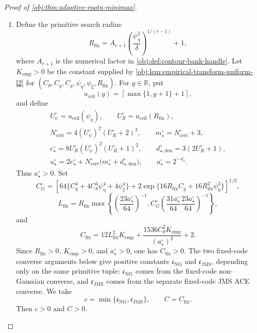 \begin{proof}[Proof of \cref{obj:thm:adaptive-rootn-minimax}]
\begin{enumerate}
\item Define the primitive search radius
\[
R_{\mathrm{fix}}
=
A_{r+1}\left(\frac{\psi_{\eta}^{2}}{\delta}\right)^{1/(r-1)}+1,
\]
where \(A_{r+1}\) is the numerical factor in \cref{obj:def:contour-bank-handle}.  Let \(K_{\mathrm{emp}}>0\) be the constant supplied by \cref{obj:lem:empirical-transform-uniform-l2} for
\((C_{\theta},C_g,C_q,\psi_{\eta},\psi_{\xi},R_{\mathrm{fix}})\).  For \(y\in\mathbb R\), put
\[
u_{\mathrm{ceil}}(y)=\left\lceil \max\{1,y+1\}+1\right\rceil ,
\]
and define
\[
\begin{gathered}
U_{\psi}^{\circ}=u_{\mathrm{ceil}}(\psi_{\eta}),\qquad
U_R^{\circ}=u_{\mathrm{ceil}}(R_{\mathrm{fix}}),\\
N_{\mathrm{cert}}^{\circ}=4(U_{\psi}^{\circ})^2(U_R^{\circ}+2)^3,\qquad
m_{\star}^{\circ}=N_{\mathrm{cert}}^{\circ}+3,\\
e_{\star}^{\circ}=8U_R^{\circ}(U_{\psi}^{\circ})^2(U_R^{\circ}+1)^2,\qquad
d_{\star,\mathrm{den}}^{\circ}=3(2U_R^{\circ}+1),\\
u_{\star}^{\circ}=2e_{\star}^{\circ}
+N_{\mathrm{cert}}^{\circ}\bigl(m_{\star}^{\circ}+d_{\star,\mathrm{den}}^{\circ}\bigr),
\qquad
a_{\star}^{\circ}=2^{-u_{\star}^{\circ}}.
\end{gathered}
\]
Thus \(a_{\star}^{\circ}>0\).  Set
\[
C_G^{\circ}
=
\left[
64\{C_q^4+4C_{\theta}^4\psi_{\eta}^4+4\psi_{\xi}^4\}
+2\exp\{16R_{\mathrm{fix}}C_g+16R_{\mathrm{fix}}^2\psi_{\eta}^2\}
\right]^{1/2},
\]
\[
L_{\mathrm{fix}}
=
R_{\mathrm{fix}}
\max\left\{
\left(\frac{23a_{\star}^{\circ}}{64}\right)^{-1},
C_G^{\circ}
\left(\frac{31a_{\star}^{\circ}}{64}\frac{23a_{\star}^{\circ}}{64}\right)^{-1}
\right\},
\]
and
\[
C_{\mathrm{fix}}
=
12L_{\mathrm{fix}}^2K_{\mathrm{emp}}
+\frac{1536C_{\theta}^2K_{\mathrm{emp}}}{(a_{\star}^{\circ})^2}
+2.
\]
Since \(R_{\mathrm{fix}}>0\), \(K_{\mathrm{emp}}>0\), and \(a_{\star}^{\circ}>0\), one has \(C_{\mathrm{fix}}>0\).  The two fixed-code converse arguments below give positive constants \(\mathfrak c_{\mathrm{NG}}\) and \(\mathfrak c_{\mathrm{JMS}}\), depending only on the same primitive tuple: \(\mathfrak c_{\mathrm{NG}}\) comes from the fixed-code non-Gaussian converse, and \(\mathfrak c_{\mathrm{JMS}}\) comes from the separate fixed-code JMS ACE converse.  We take
\[
c=\min\{\mathfrak c_{\mathrm{NG}},\mathfrak c_{\mathrm{JMS}}\},
\qquad
C=C_{\mathrm{fix}}.
\]
Then \(c>0\) and \(C>0\). %


\end{enumerate}
\end{proof}

